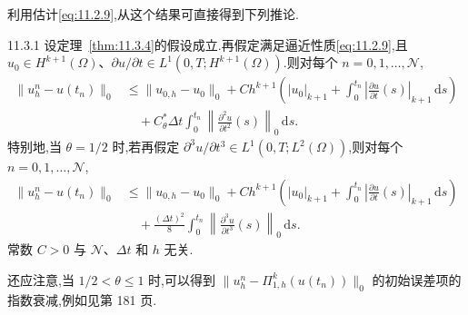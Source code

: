 利用估计\eqref{eq:11.2.9},从这个结果可直接得到下列推论.

\begin{corollary}[]{11.3.1}
设定理~\ref{thm:11.3.4}的假设成立.再假定满足逼近性质\eqref{eq:11.2.9},且 \(u_0\in H^{k+1}(\Omega)\)、\(\partial u/\partial t\in L^1(0,T;H^{k+1}(\Omega))\).则对每个 \(n=0,1,\ldots,\mathcal N\),
\begin{equation}\label{eq:11.3.36}
  \begin{aligned}
    \|u_h^n-u(t_n)\|_0
      &\le\|u_{0,h}-u_0\|_0+Ch^{k+1}\left(
           |u_0|_{k+1}+\int_0^{t_n}\left|\frac{\partial u}{\partial t}(s)\right|_{k+1}\,\mathrm ds\right)\\
      &\quad+C_\theta^*\Delta t\int_0^{t_n}
                \left\|\frac{\partial^2u}{\partial t^2}(s)\right\|_0\,\mathrm ds .
  \end{aligned}
\end{equation}
特别地,当 \(\theta=1/2\) 时,若再假定 \(\partial^3u/\partial t^3\in L^1(0,T;L^2(\Omega))\),则对每个 \(n=0,1,\ldots,\mathcal N\),
\begin{equation}\label{eq:11.3.37}
  \begin{aligned}
    \|u_h^n-u(t_n)\|_0
      &\le\|u_{0,h}-u_0\|_0+Ch^{k+1}\left(
         |u_0|_{k+1}+\int_0^{t_n}\left|\frac{\partial u}{\partial t}(s)\right|_{k+1}\,\mathrm ds\right)\\
      &\quad+\frac{(\Delta t)^2}{8}\int_0^{t_n}
                   \left\|\frac{\partial^3u}{\partial t^3}(s)\right\|_0\,\mathrm ds .
  \end{aligned}
\end{equation}
常数 \(C>0\) 与 \(\mathcal N\)、\(\Delta t\) 和 \(h\) 无关.
\end{corollary}

还应注意,当 \(1/2<\theta\le1\) 时,可以得到 \(\|u_h^n-\Pi_{1,h}^k(u(t_n))\|_0\) 的初始误差项的指数衰减,例如见第 181 页.

